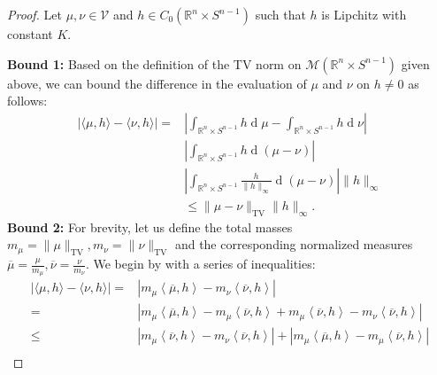 \documentclass[11pt]{article}
\newcommand{\R}{\mathbb{R}}
\begin{document}
\begin{proof}
Let $\mu,\nu\in\mathcal{V}$ and $h\in C_0(\R^n\times S^{n-1})$ such that $h$ is Lipchitz with constant $K$. 

\textbf{Bound 1:} Based on the definition of the TV norm on $\mathcal{M}(\R^n \times S^{n-1})$ given above, we can bound the difference in the evaluation of $\mu$ and $\nu$ on $h\neq 0$ as follows:
\begin{align*}
    |\langle\mu,h\rangle-\langle\nu,h\rangle|=&\left|\int_{\R^n\times S^{n-1}} h\operatorname{d}\mu-\int_{\R^n\times S^{n-1}} h\operatorname{d}\nu\right|\\
    &\left|\int_{\R^n\times S^{n-1}} h\operatorname{d}(\mu-\nu)\right|\\
    &\left|\int_{\R^n\times S^{n-1}} \frac{h}{\|h\|_\infty}\operatorname{d}(\mu-\nu)\right| \|h\|_{\infty} \\
    &\leq \|\mu-\nu\|_{\text{TV}} \|h\|_{\infty}. 
\end{align*}
\textbf{Bound 2:} For brevity, let us define the total masses $m_\mu=\|\mu\|_{\text{TV}}, m_\nu=\|\nu\|_{\text{TV}}$ and the corresponding normalized measures $\overline{\mu} = \frac{\mu}{m_\mu},\overline{\nu} = \frac{\nu}{m_\nu}$. We begin by with a series of inequalities:
\begin{align*}
    |\langle\mu,h\rangle-\langle\nu,h\rangle|=& \left|m_\mu\left\langle\overline{\mu},h\right\rangle-m_\nu\left\langle\overline{\nu},h\right\rangle\right|\\ =& \left|m_\mu\left\langle\overline{\mu},h\right\rangle-m_\mu\left\langle\overline{\nu},h\right\rangle+m_\mu\left\langle\overline{\nu},h\right\rangle-m_\nu\left\langle\overline{\nu},h\right\rangle\right|\\ 
    \leq&\left|m_\mu\left\langle\overline{\nu},h\right\rangle-m_\nu\left\langle\overline{\nu},h\right\rangle\right|+\left|m_\mu\left\langle\overline{\mu},h\right\rangle-m_\mu\left\langle\overline{\nu},h\right\rangle\right|\\

\end{align*}
\end{proof}
\end{document}
